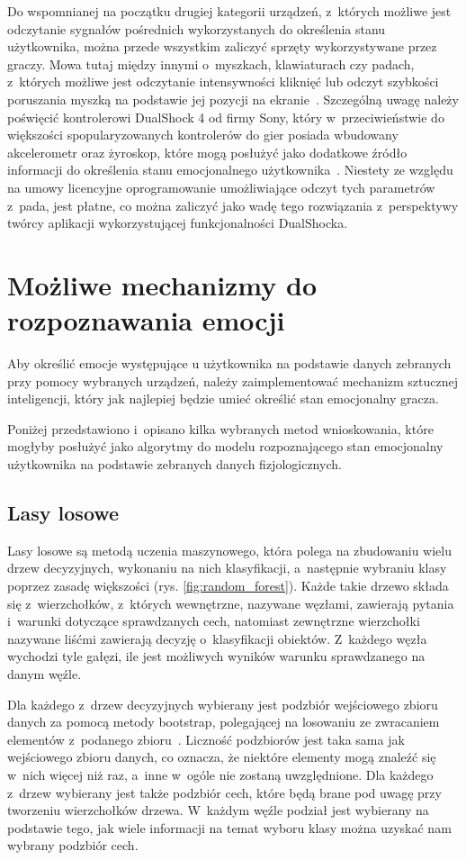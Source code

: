 Do wspomnianej na początku drugiej kategorii urządzeń, z~których możliwe jest odczytanie sygnałów pośrednich wykorzystanych do określenia stanu użytkownika, można przede wszystkim zaliczyć sprzęty wykorzystywane przez graczy. Mowa tutaj między innymi o~myszkach, klawiaturach czy padach, z~których możliwe jest odczytanie intensywności kliknięć lub odczyt szybkości poruszania myszką na podstawie jej pozycji na ekranie~\cite{measuring_emotion_from_gamepad}. Szczególną uwagę należy poświęcić kontrolerowi DualShock 4 od firmy Sony, który w~przeciwieństwie do większości spopularyzowanych kontrolerów do gier posiada wbudowany akcelerometr oraz żyroskop, które mogą posłużyć jako dodatkowe źródło informacji do określenia stanu emocjonalnego użytkownika~\cite{dualshock_specification}. Niestety ze względu na umowy licencyjne oprogramowanie umożliwiające odczyt tych parametrów z~pada, jest płatne, co można zaliczyć jako wadę tego rozwiązania z~perspektywy twórcy aplikacji wykorzystującej funkcjonalności DualShocka.

\section{Możliwe mechanizmy do rozpoznawania emocji}
Aby określić emocje występujące u użytkownika na podstawie danych zebranych przy pomocy wybranych urządzeń, należy zaimplementować mechanizm sztucznej inteligencji, który jak najlepiej będzie umieć określić stan emocjonalny gracza. 

Poniżej przedstawiono i~opisano kilka wybranych metod wnioskowania, które mogłyby posłużyć jako algorytmy do modelu rozpoznającego stan emocjonalny użytkownika na podstawie zebranych danych fizjologicznych.

\subsection{Lasy losowe}
Lasy losowe są metodą uczenia maszynowego, która polega na zbudowaniu wielu drzew decyzyjnych, wykonaniu na nich klasyfikacji, a~następnie wybraniu klasy poprzez zasadę większości (rys. \ref{fig:random_forest}). Każde takie drzewo składa się z~wierzchołków, z~których wewnętrzne, nazywane węzłami, zawierają pytania i~warunki dotyczące sprawdzanych cech, natomiast zewnętrzne wierzchołki nazywane liśćmi zawierają decyzję o~klasyfikacji obiektów. Z~każdego węzła wychodzi tyle gałęzi, ile jest możliwych wyników warunku sprawdzanego na danym węźle.

Dla każdego z~drzew decyzyjnych wybierany jest podzbiór wejściowego zbioru danych za pomocą metody bootstrap, polegającej na losowaniu ze zwracaniem elementów z~podanego zbioru~\cite{flach_2012}. Liczność podzbiorów jest taka sama jak wejściowego zbioru danych, co oznacza, że niektóre elementy mogą znaleźć się w~nich więcej niż raz, a~inne w~ogóle nie zostaną uwzględnione. Dla każdego z~drzew wybierany jest także podzbiór cech, które będą brane pod uwagę przy tworzeniu wierzchołków drzewa. W~każdym węźle podział jest wybierany na podstawie tego, jak wiele informacji na temat wyboru klasy można uzyskać nam wybrany podzbiór cech.

